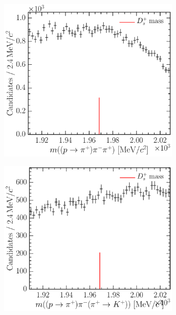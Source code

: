 \begin{figure}
\begin{subfigure}[b]{0.3\textwidth}
    \caption{\decay{\PDsplus}{\Ppiplus\PKminus\PKplus}}
    \label{fig:cpv:selection:background_study:ppipi_meson:pikk}
  \end{subfigure}
  \begin{subfigure}[b]{0.3\textwidth}
    \includegraphics[width=\textwidth]{figures/cpv/selection/background_study/ppipi/LcToppipi_2012_MagDown_Ds_ppTopip_pim_pip}
    \caption{\decay{\PDsplus}{\Ppiplus\Ppiminus\Ppiplus}}
    \label{fig:cpv:selection:background_study:ppipi_meson:pipipi}
  \end{subfigure}
  \begin{subfigure}[b]{0.3\textwidth}
    \includegraphics[width=\textwidth]{figures/cpv/selection/background_study/ppipi/LcToppipi_2012_MagDown_Ds_ppTopip_pim_pipTokp}

\end{subfigure}
\end{figure}
